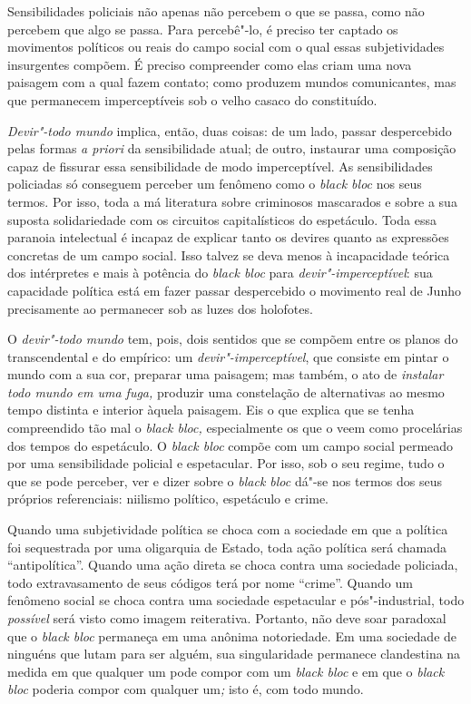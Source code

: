 Sensibilidades policiais não apenas não percebem o que se passa, como
não percebem que algo se passa. Para percebê"-lo, é preciso ter captado
os movimentos políticos ou reais do campo social com o qual essas
subjetividades insurgentes compõem. É preciso compreender como elas
criam uma nova paisagem com a qual fazem contato; como produzem mundos
comunicantes, mas que permanecem imperceptíveis sob o velho casaco do
constituído.

\emph{Devir"-todo mundo} implica, então, duas coisas: de um lado, passar
despercebido pelas formas \emph{a priori }da sensibilidade atual; de
outro, instaurar uma composição capaz de fissurar essa sensibilidade de
modo imperceptível. As sensibilidades policiadas só conseguem perceber
um fenômeno como o \emph{black bloc} nos seus termos. Por isso, toda a
má literatura sobre criminosos mascarados e sobre a sua suposta
solidariedade com os circuitos capitalísticos do espetáculo. Toda essa
paranoia intelectual é incapaz de explicar tanto os devires quanto as
expressões concretas de um campo social. Isso talvez se deva menos à
incapacidade teórica dos intérpretes e mais à potência do \emph{black
bloc }para \emph{devir"-imperceptível}: sua capacidade política está em
fazer passar despercebido o movimento real de Junho precisamente ao
permanecer sob as luzes dos holofotes.

O \emph{devir"-todo mundo} tem, pois, dois sentidos que se compõem entre
os planos do transcendental e do empírico: um
\emph{devir"-imperceptível}, que consiste em pintar o mundo com a sua
cor, preparar uma paisagem; mas também, o ato de \emph{instalar todo
mundo em uma fuga, }produzir uma constelação de alternativas ao mesmo
tempo distinta e interior àquela paisagem. Eis o que explica que se
tenha compreendido tão mal o \emph{black bloc, }especialmente os que o
veem como procelárias dos tempos do espetáculo. O \emph{black bloc}
compõe com um campo social permeado por uma sensibilidade policial e
espetacular. Por isso, sob o seu regime, tudo o que se pode perceber,
ver e dizer sobre o \emph{black bloc} dá"-se nos termos dos seus próprios
referenciais: niilismo político, espetáculo e crime.

Quando uma subjetividade política se choca com a sociedade em que a
política foi sequestrada por uma oligarquia de Estado, toda ação
política será chamada ``antipolítica''. Quando uma ação direta se choca
contra uma sociedade policiada, todo extravasamento de seus códigos terá
por nome ``crime''. Quando um fenômeno social se choca contra uma
sociedade espetacular e pós"-industrial, todo\emph{ possível }será visto
como imagem reiterativa. Portanto, não deve soar paradoxal que o
\emph{black bloc }permaneça em uma anônima notoriedade. Em uma sociedade
de ninguéns que lutam para ser alguém, sua singularidade permanece
clandestina na medida em que qualquer um pode compor com um \emph{black
bloc }e em que o \emph{black bloc }poderia compor com qualquer um\emph{;
}isto é, com todo mundo.

